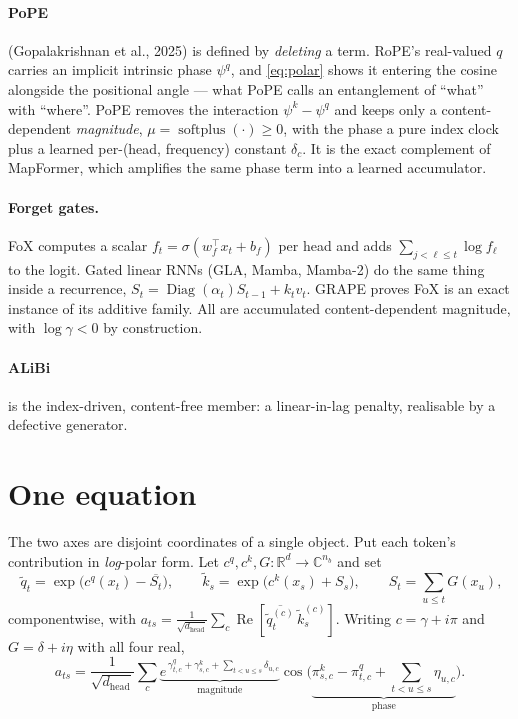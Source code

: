 \documentclass[11pt]{article}
\newcommand{\R}{\mathbb{R}}
\newcommand{\C}{\mathbb{C}}
\newcommand{\hd}{d_{\mathrm{head}}}
\newcommand{\nb}{n_b}
\DeclareMathOperator{\softplus}{softplus}
\begin{document}
\paragraph{PoPE} (Gopalakrishnan et al., 2025) is defined by \emph{deleting} a term.
RoPE's real-valued $q$ carries an implicit intrinsic phase $\psi^q$, and
\eqref{eq:polar} shows it entering the cosine alongside the positional angle ---
what PoPE calls an entanglement of ``what'' with ``where''. PoPE removes the
interaction $\psi^k - \psi^q$ and keeps only a content-dependent \emph{magnitude},
$\mu = \softplus(\cdot) \ge 0$, with the phase a pure index clock plus a learned
per-(head, frequency) constant $\delta_c$. It is the exact complement of MapFormer,
which amplifies the same phase term into a learned accumulator.

\paragraph{Forget gates.} FoX computes a scalar $f_t = \sigma(w_f^\top x_t + b_f)$
per head and adds $\sum_{j<\ell\le t}\log f_\ell$ to the logit. Gated linear RNNs
(GLA, Mamba, Mamba-2) do the same thing inside a recurrence,
$S_t = \operatorname{Diag}(\alpha_t)S_{t-1} + k_tv_t$. GRAPE proves FoX is an exact
instance of its additive family. All are accumulated content-dependent magnitude,
with $\log\gamma < 0$ by construction.

\paragraph{ALiBi} is the index-driven, content-free member: a linear-in-lag penalty,
realisable by a defective generator.


\section{One equation}
\label{sec:unify}

The two axes are disjoint coordinates of a single object. Put each token's
contribution in \emph{log}-polar form. Let $c^q, c^k, G : \R^d \to \C^{\nb}$ and set
\begin{equation}
  \label{eq:unified}
  \boxed{\;
  \tilde q_t = \exp\!\big(c^q(x_t) - \overline{S_t}\big),\qquad
  \tilde k_s = \exp\!\big(c^k(x_s) + S_s\big),\qquad
  S_t = \textstyle\sum_{u\le t} G(x_u),}
\end{equation}
componentwise, with $a_{ts} = \tfrac{1}{\sqrt{\hd}}\sum_c
\operatorname{Re}[\overline{\tilde q_t^{(c)}}\,\tilde k_s^{(c)}]$. Writing
$c = \gamma + i\pi$ and $G = \delta + i\eta$ with all four real,
\begin{equation}
  a_{ts} = \frac{1}{\sqrt{\hd}}\sum_c
  \underbrace{e^{\,\gamma^q_{t,c}+\gamma^k_{s,c}+\sum_{t<u\le s}\delta_{u,c}}}_{\text{magnitude}}
  \cos\Big(\underbrace{\pi^k_{s,c}-\pi^q_{t,c}+\textstyle\sum_{t<u\le s}\eta_{u,c}}_{\text{phase}}\Big).
\end{equation}
\end{document}
